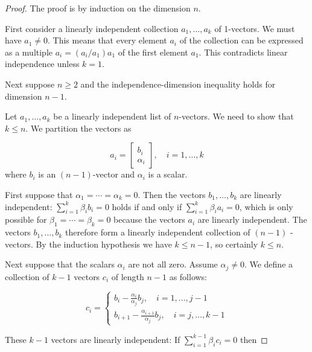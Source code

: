 \begin{proof}
    The proof is by induction on the dimension $n$.

    First consider a linearly independent collection $ a_{1}, \ldots, a_{k} $ of 1-vectors. We must have $ a_{1} \neq 0 $. This means that every element $ a_{i} $ of the collection can be expressed as a multiple $ a_{i}=\left(a_{i} / a_{1}\right) a_{1} $ of the first element $ a_{1} $. This contradicts linear independence unless $ k=1 $.

    Next suppose $ n \geq 2 $ and the independence-dimension inequality holds for dimension $ n-1 $. 
    
    Let $ a_{1}, \ldots, a_{k} $ be a linearly independent list of $ n $-vectors. We need to show that $ k \leq n $. We partition the vectors as

    $$
    a_{i}=\left[\begin{array}{r}
    b_{i} \\
    \alpha_{i}
    \end{array}\right], \quad i=1, \ldots, k
    $$
    where $ b_{i} $ is an $ (n-1) $-vector and $ \alpha_{i} $ is a scalar.

    First suppose that $ \alpha_{1}=\cdots=\alpha_{k}=0 $. Then the vectors $ b_{1}, \ldots, b_{k} $ are linearly independent: $ \sum_{i=1}^{k} \beta_{i} b_{i}=0 $ holds if and only if $ \sum_{i=1}^{k} \beta_{i} a_{i}=0 $, which is only possible for $ \beta_{1}=\cdots=\beta_{k}=0 $ because the vectors $ a_{i} $ are linearly independent. The vectors $ b_{1}, \ldots, b_{k} $ therefore form a linearly independent collection of $ (n-1) $ -vectors. By the induction hypothesis we have $ k \leq n-1 $, so certainly $ k \leq n $.

    Next suppose that the scalars $ \alpha_{i} $ are not all zero. Assume $ \alpha_{j} \neq 0 . $ We define a collection of $ k-1 $ vectors $ c_{i} $ of length $ n-1 $ as follows:

    $$c_{i}=\left\{\begin{matrix} 
        b_{i}-\frac{\alpha_{i}}{\alpha_{j}} b_{j}, \quad i=1, \ldots, j-1  \\  
       b_{i+1}-\frac{\alpha_{i+1}}{\alpha_{j}} b_{j}, \quad i=j, \ldots, k-1  
     \end{matrix}\right. $$

     These $ k-1 $ vectors are linearly independent: If $ \sum_{i=1}^{k-1} \beta_{i} c_{i}=0 $ then


\end{proof}
